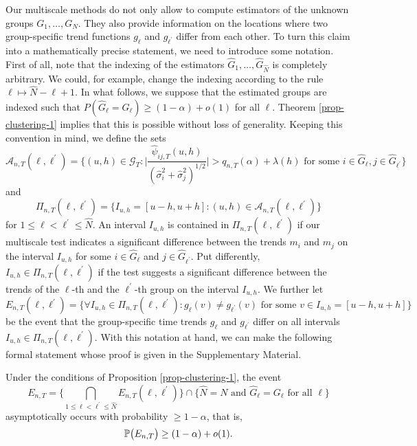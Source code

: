 Our multiscale methods do not only allow to compute estimators of the unknown groups $G_1,\ldots,G_N$. They also provide information on the locations where two group-specific trend functions $g_\ell$ and $g_{\ell^\prime}$ differ from each other. To turn this claim into a mathematically precise statement, we need to introduce some notation. First of all, note that the indexing of the estimators $\widehat{G}_1,\ldots,\widehat{G}_{\widehat{N}}$ is completely arbitrary. We could, for example, change the indexing according to the rule $\ell \mapsto \widehat{N} - \ell + 1$. In what follows, we suppose that the estimated groups are indexed such that $P( \widehat{G}_\ell = G_\ell) \ge (1-\alpha) + o(1)$ for all $\ell$. Theorem \ref{prop-clustering-1} implies that this is possible without loss of generality. Keeping this convention in mind, we define the sets 
\[ \mathcal{A}_{n,T}(\ell,\ell^\prime) = \Big\{ (u,h) \in \mathcal{G}_T: \Big| \frac{\widehat{\psi}_{ij,T}(u,h)}{(\widehat{\sigma}_i^2 + \widehat{\sigma}_j^2)^{1/2}} \Big| > q_{n,T}(\alpha) + \lambda(h) \text{ for some } i \in \widehat{G}_\ell, j \in \widehat{G}_{\ell^\prime} \Big\} \] 
and  
\[ \Pi_{n,T}(\ell,\ell^\prime) = \big\{ I_{u,h} = [u-h,u+h]: (u,h) \in \mathcal{A}_{n,T}(\ell,\ell^\prime) \big\} \]
for $1 \le \ell < \ell^\prime \le \widehat{N}$. An interval $I_{u,h}$ is contained in $\Pi_{n,T}(\ell,\ell^\prime)$ if our multiscale test indicates a significant difference between the trends $m_i$ and $m_j$ on the interval $I_{u,h}$ for some $i \in \widehat{G}_\ell$ and $j \in \widehat{G}_{\ell^\prime}$. Put differently,  $I_{u,h} \in \Pi_{n,T}(\ell,\ell^\prime)$ if the test suggests a significant difference between the trends of the $\ell$-th and the $\ell^\prime$-th group on the interval $I_{u,h}$. We further let
\[ E_{n,T}(\ell,\ell^\prime) = \Big\{ \forall I_{u,h} \in \Pi_{n,T}(\ell,\ell^\prime): g_\ell(v) \ne g_{\ell^\prime}(v) \text{ for some } v \in I_{u,h} = [u-h,u+h] \Big\} \]
be the event that the group-specific time trends $g_\ell$ and $g_{\ell^\prime}$ differ on all intervals $I_{u,h} \in \Pi_{n,T}(\ell,\ell^\prime)$. With this notation at hand, we can make the following formal statement whose proof is given in the Supplementary Material.
\begin{prop}\label{prop-clustering-2}
Under the conditions of Proposition \ref{prop-clustering-1}, the event 
\[ E_{n,T} = \Big\{ \bigcap_{1 \le \ell < \ell^\prime \le \widehat{N}} E_{n,T}(\ell,\ell^\prime) \Big\} \cap \Big\{ \widehat{N} = N \text{ and } \widehat{G}_\ell = G_\ell \text{ for all } \ell \Big\} \]
asymptotically occurs with probability $\ge 1-\alpha$, that is, 
\[ \mathbb{P} \big( E_{n,T} \big) \ge (1 - \alpha) + o(1). \]
\end{prop}
